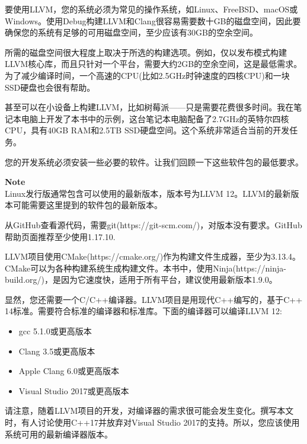 要使用LLVM，您的系统必须为常见的操作系统，如Linux、FreeBSD、macOS或Windows。使用Debug构建LLVM和Clang很容易需要数十GB的磁盘空间，因此要确保您的系统有足够的可用磁盘空间，至少应该有30GB的空余空间。\par

所需的磁盘空间很大程度上取决于所选的构建选项。例如，仅以发布模式构建LLVM核心库，而且只针对一个平台，需要大约2GB的空余空间，这是最低需求。为了减少编译时间，一个高速的CPU(比如2.5GHz时钟速度的四核CPU)和一块SSD硬盘也会很有帮助。\par

甚至可以在小设备上构建LLVM，比如树莓派——只是需要花费很多时间。我在笔记本电脑上开发了本书中的示例，这台笔记本电脑配备了2.7GHz的英特尔四核CPU，具有40GB RAM和2.5TB SSD硬盘空间。这个系统非常适合当前的开发任务。\par

您的开发系统必须安装一些必要的软件。让我们回顾一下这些软件包的最低要求。\par

\begin{tcolorbox}[colback=blue!5!white,colframe=blue!75!black]
\textbf{Note} \\
Linux发行版通常包含可以使用的最新版本，版本号为LLVM 12。LLVM的最新版本可能需要这里提到的软件包的最新版本。
\end{tcolorbox}

从GitHub查看源代码，需要git(https://git-scm.com/)，对版本没有要求。GitHub帮助页面推荐至少使用1.17.10.\par

LLVM项目使用CMake(https://cmake.org/)作为构建文件生成器，至少为3.13.4。CMake可以为各种构建系统生成构建文件。本书中，使用Ninja(https://ninja-build.org/)，是因为它速度快，适用于所有平台，建议使用最新版本1.9.0。\par

显然，您还需要一个C/C++编译器。LLVM项目是用现代C++编写的，基于C++ 14标准。需要符合标准的编译器和标准库。下面的编译器可以编译LLVM 12:\par

\begin{itemize}
	\item gcc 5.1.0或更高版本
	\item Clang 3.5或更高版本
	\item Apple Clang 6.0或更高版本
	\item Visual Studio 2017或更高版本
\end{itemize}

请注意，随着LLVM项目的开发，对编译器的需求很可能会发生变化。撰写本文时，有人讨论使用C++17并放弃对Visual Studio 2017的支持。所以，您应该使用系统可用的最新编译器版本。\par

